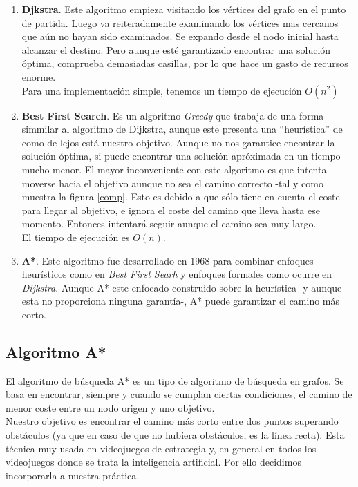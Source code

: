 \documentclass[a4paper,12pt,oneside]{book}
\begin{document}
\begin{enumerate}
\item {\bf Djkstra}. Este algoritmo empieza visitando los vértices del
  grafo en el punto de partida. Luego va reiteradamente examinando los
  vértices mas cercanos que aún no hayan sido examinados. Se expando
  desde el nodo inicial hasta alcanzar el destino. Pero aunque esté
  garantizado encontrar una solución óptima, comprueba demasiadas
  casillas, por lo que hace un gasto de recursos enorme.\\
  Para una implementación simple, tenemos un tiempo de ejecución $O(n^2)$
\item {\bf Best First Search}. Es un algoritmo {\it Greedy} que
  trabaja de una forma simmilar al algoritmo de Dijkstra, aunque este
  presenta una ``heurística'' de como de lejos está nuestro
  objetivo. Aunque no nos garantice encontrar la solución óptima, si
  puede encontrar una solución apróximada en un tiempo mucho menor. El
  mayor inconveniente con este algoritmo es que intenta moverse hacia
  el objetivo aunque no sea el camino correcto -tal y como muestra la
  figura \ref{comp}. Esto es debido a que sólo tiene en cuenta el
  coste para llegar al objetivo, e ignora el coste del camino que
  lleva hasta ese momento. Entonces intentará seguir aunque el camino
  sea muy largo.\\
  El tiempo de ejecución es $O(n)$.
\item {\bf A*}. Este algoritmo fue desarrollado en 1968 para combinar
  enfoques heurísticos como en {\it Best First Searh} y enfoques
  formales como ocurre en {\it Dijkstra}. Aunque A* este enfocado
  construido sobre la heurística -y aunque esta no proporciona ninguna
  garantía-, A* puede garantizar el camino más corto.
\end{enumerate}

\subsection{Algoritmo A*}
El algoritmo de búsqueda A* es un tipo de algoritmo de búsqueda en
grafos. Se basa en encontrar, siempre y cuando se cumplan ciertas
condiciones, el camino de menor coste entre un nodo origen y uno
objetivo.\\

Nuestro objetivo es encontrar el camino más corto entre dos puntos
superando obstáculos (ya que en caso de que no hubiera obstáculos, es la
línea recta). Esta técnica muy usada en videojuegos de
estrategia y, en general en todos los videojuegos donde se trata la
inteligencia artificial. Por ello decidimos incorporarla a nuestra práctica.\\
\end{document}
